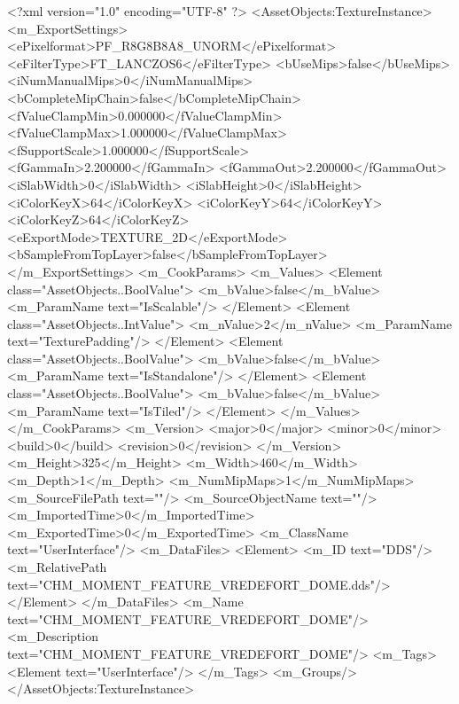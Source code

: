 <?xml version="1.0" encoding="UTF-8" ?>
<AssetObjects:TextureInstance>
<m_ExportSettings>
<ePixelformat>PF_R8G8B8A8_UNORM</ePixelformat>
<eFilterType>FT_LANCZOS6</eFilterType>
<bUseMips>false</bUseMips>
<iNumManualMips>0</iNumManualMips>
<bCompleteMipChain>false</bCompleteMipChain>
<fValueClampMin>0.000000</fValueClampMin>
<fValueClampMax>1.000000</fValueClampMax>
<fSupportScale>1.000000</fSupportScale>
<fGammaIn>2.200000</fGammaIn>
<fGammaOut>2.200000</fGammaOut>
<iSlabWidth>0</iSlabWidth>
<iSlabHeight>0</iSlabHeight>
<iColorKeyX>64</iColorKeyX>
<iColorKeyY>64</iColorKeyY>
<iColorKeyZ>64</iColorKeyZ>
<eExportMode>TEXTURE_2D</eExportMode>
<bSampleFromTopLayer>false</bSampleFromTopLayer>
</m_ExportSettings>
<m_CookParams>
<m_Values>
<Element class="AssetObjects..BoolValue">
<m_bValue>false</m_bValue>
<m_ParamName text="IsScalable"/>
</Element>
<Element class="AssetObjects..IntValue">
<m_nValue>2</m_nValue>
<m_ParamName text="TexturePadding"/>
</Element>
<Element class="AssetObjects..BoolValue">
<m_bValue>false</m_bValue>
<m_ParamName text="IsStandalone"/>
</Element>
<Element class="AssetObjects..BoolValue">
<m_bValue>false</m_bValue>
<m_ParamName text="IsTiled"/>
</Element>
</m_Values>
</m_CookParams>
<m_Version>
<major>0</major>
<minor>0</minor>
<build>0</build>
<revision>0</revision>
</m_Version>
<m_Height>325</m_Height>
<m_Width>460</m_Width>
<m_Depth>1</m_Depth>
<m_NumMipMaps>1</m_NumMipMaps>
<m_SourceFilePath text=""/>
<m_SourceObjectName text=""/>
<m_ImportedTime>0</m_ImportedTime>
<m_ExportedTime>0</m_ExportedTime>
<m_ClassName text="UserInterface"/>
<m_DataFiles>
<Element>
<m_ID text="DDS"/>
<m_RelativePath text="CHM_MOMENT_FEATURE_VREDEFORT_DOME.dds"/>
</Element>
</m_DataFiles>
<m_Name text="CHM_MOMENT_FEATURE_VREDEFORT_DOME"/>
<m_Description text="CHM_MOMENT_FEATURE_VREDEFORT_DOME"/>
<m_Tags>
<Element text="UserInterface"/>
</m_Tags>
<m_Groups/>
</AssetObjects:TextureInstance>
